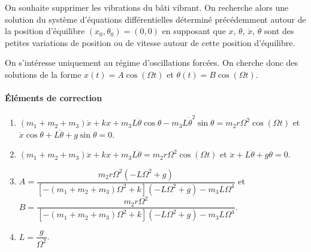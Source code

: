 \begin{multicols}{2}
\ifprof
\begin{corrige}
\end{corrige}
\else
\fi
On souhaite supprimer les vibrations du bâti vibrant. On recherche alors une solution du système d’équations différentielles
déterminé précédemment autour de la position d’équilibre $\left(x_0,\theta_0\right)=(0,0)$ en supposant que $x$, $\theta$, $\dot{x}$, $\dot{\theta}$ sont des petites variations
de position ou de vitesse autour de cette position d’équilibre.


\ifprof
\begin{corrige}
\end{corrige}
\else
\fi

On s’intéresse uniquement au régime d’oscillations forcées. On cherche donc des solutions de la forme $x(t)=A\cos\left( \Omega t \right)$ et $\theta(t)=B\cos\left( \Omega t \right)$.


\ifprof
\begin{corrige}
\end{corrige}
\else
\fi



\ifprof
\begin{corrige}
\end{corrige}
\else
\fi



\vspace{1cm}
\ifcolle
\else
\paragraph*{Éléments de correction}
\footnotesize

\begin{enumerate}
\item $\left( m_1 + m_2 + m_3\right) \ddot{x} + kx + m_3 L\ddot{\theta} \cos \theta - m_3 L\dot{\theta}^2 \sin \theta = m_2 r \Omega^2 \cos \left( \Omega t \right)$ et $\ddot{x}\cos\theta+L\ddot{\theta}+g\sin\theta=0$.
\item $\left( m_1 + m_2 + m_3\right) \ddot{x} + kx + m_3 L\ddot{\theta}= m_2 r \Omega^2 \cos \left( \Omega t \right)$ et $\ddot{x}+L\ddot{\theta}+g\theta=0$.
\item $A=\dfrac{m_2 r \Omega^2 \left( -L\Omega^2 + g\right)}{\left[-\left( m_1 + m_2 + m_3\right)\Omega^2 +k\right]\left( -L\Omega^2 +g\right)-m_3L\Omega^4}$ et 
$B=\dfrac{m_2 r \Omega^2 }{\left[-\left( m_1 + m_2 + m_3\right)\Omega^2 +k\right]\left( -L\Omega^2 +g\right)-m_3L\Omega^4}$.
\item $L=\dfrac{g}{\Omega^2}$.
\end{enumerate}
\normalsize
\fi

\end{multicols}
\fi

